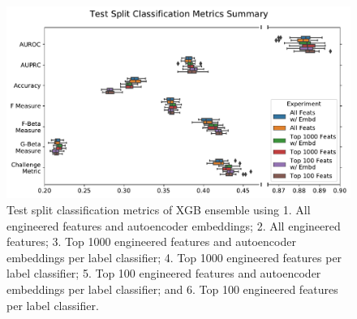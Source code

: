 \documentclass[\main/thesis.tex]{subfiles}
\begin{document}
\begin{figure}[h]
    \centering
    \includegraphics[trim={0.2cm 0.3cm 0.2cm 0.1cm},clip,width=\textwidth]{figure/xgb_aenc_classification_metrics.pdf}
    \caption[Test split classification metrics of XGB ensemble using all engineered features and autoencoder embeddings]{Test split classification metrics of XGB ensemble using 1. All engineered features and autoencoder embeddings; 2. All engineered features; 3. Top 1000 engineered features and autoencoder embeddings per label classifier; 4. Top 1000 engineered features per label classifier; 5. Top 100 engineered features and autoencoder embeddings per label classifier; and 6. Top 100 engineered features per label classifier.}
    \label{fig:xgb_aenc_classification_metrics}
\end{figure}
\end{document}
